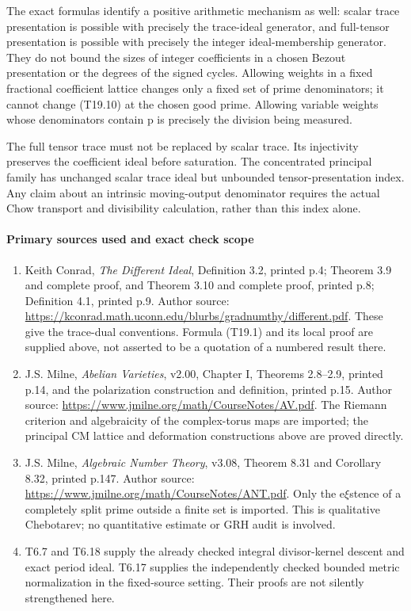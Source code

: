 \documentclass[11pt,a4paper]{article}
\providecommand{\tightlist}{\setlength{\itemsep}{0pt}\setlength{\parskip}{0pt}}
\theoremstyle{definition}
\begin{document}
The exact formulas identify a positive arithmetic mechanism as well: scalar trace presentation is possible with precisely the trace-ideal generator, and full-tensor presentation is possible with precisely the integer ideal-membership generator. They do not bound the sizes of integer coefficients in a chosen Bezout presentation or the degrees of the signed cycles. Allowing weights in a fixed fractional coefficient lattice changes only a fixed set of prime denominators; it cannot change (T19.10) at the chosen good prime. Allowing variable weights whose denominators contain p is precisely the division being measured.

The full tensor trace must not be replaced by scalar trace. Its injectivity preserves the coefficient ideal before saturation. The concentrated principal family has unchanged scalar trace ideal but unbounded tensor-presentation index. Any claim about an intrinsic moving-output denominator requires the actual Chow transport and divisibility calculation, rather than this index alone.

\paragraph{Primary sources used and exact check scope}\label{primary-sources-used-and-exact-check-scope}

\begin{enumerate}
\def\labelenumi{\arabic{enumi}.}
\tightlist
\item
  Keith Conrad, \emph{The Different Ideal}, Definition 3.2, printed p.4; Theorem 3.9 and complete proof, and Theorem 3.10 and complete proof, printed p.8; Definition 4.1, printed p.9. Author source: \url{https://kconrad.math.uconn.edu/blurbs/gradnumthy/different.pdf}. These give the trace-dual conventions. Formula (T19.1) and its local proof are supplied above, not asserted to be a quotation of a numbered result there.
\item
  J.S. Milne, \emph{Abelian Varieties}, v2.00, Chapter I, Theorems 2.8--2.9, printed p.14, and the polarization construction and definition, printed p.15. Author source: \url{https://www.jmilne.org/math/CourseNotes/AV.pdf}. The Riemann criterion and algebraicity of the complex-torus maps are imported; the principal CM lattice and deformation constructions above are proved directly.
\item
  J.S. Milne, \emph{Algebraic Number Theory}, v3.08, Theorem 8.31 and Corollary 8.32, printed p.147. Author source: \url{https://www.jmilne.org/math/CourseNotes/ANT.pdf}. Only the e\(\xi\)stence of a completely split prime outside a finite set is imported. This is qualitative Chebotarev; no quantitative estimate or GRH audit is involved.
\item
  T6.7 and T6.18 supply the already checked integral divisor-kernel descent and exact period ideal. T6.17 supplies the independently checked bounded metric normalization in the fixed-source setting. Their proofs are not silently strengthened here.
\end{enumerate}
\end{document}
